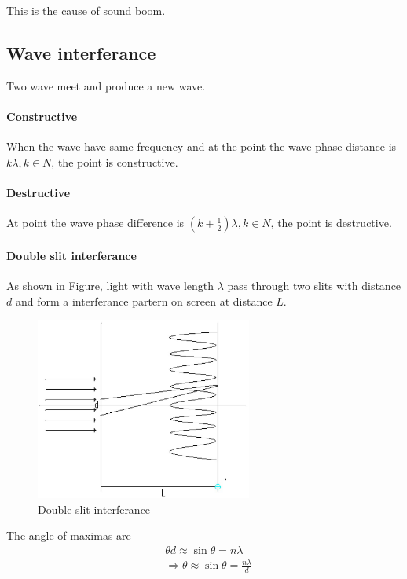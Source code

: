         This is the cause of sound boom.

    \subsection{Wave interferance}
        Two wave meet and produce a new wave. 

        \paragraph{Constructive}
            When the wave have same frequency and at the point the wave phase distance is $k \lambda, k \in N$, the point is constructive.

        \paragraph{Destructive}
            At point the wave phase difference is $(k + \frac{1}{2}) \lambda, k \in N$, the point is destructive.

        \paragraph{Double slit interferance}
            As shown in Figure, light with wave length $\lambda$ pass through two slits with distance $d$ and form a interferance partern on screen at distance $L$.
            \begin{figure}[H]
                \begin{center}
                    \includegraphics[height=6cm]{wave_charts/doub_slit.eps}
                \end{center}
                \caption{Double slit interferance}
                \label{doub_slit}
            \end{figure}

            The angle of maximas are
            \begin{align}
                & \theta d \approx \sin \theta = n \lambda \\
                & \Rightarrow \theta \approx \sin \theta = \frac{n \lambda}{d}
            \end{align}

